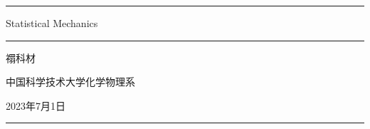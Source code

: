 \begin{titlepage}
    \centering


    \rule{\textwidth}{1pt}   %
    \vspace{0.2\textheight}  %


    {\Huge Statistical Mechanics}

    \vspace{0.025\textheight}   %

    \rule{0.83\textwidth}{0.4pt}  %

    \vspace{0.1\textheight}  %


    {\Large \textsc{\kaishu 禤科材}}

    \vspace{0.015\textheight}

    {\Large \textsc{\kaishu 中国科学技术大学\;化学物理系}}

    \vfill  %

    {\large \kaishu 2023年7月1日}
    \vspace{0.1\textheight}  %


    \rule{\textwidth}{1pt}  %

\end{titlepage}